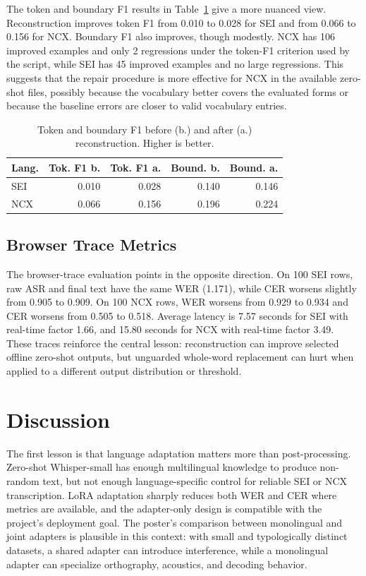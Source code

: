 \documentclass[11pt]{article}
\begin{document}
The token and boundary F1 results in Table~\ref{tab:f1} give a more nuanced view. Reconstruction improves token F1 from 0.010 to 0.028 for SEI and from 0.066 to 0.156 for NCX. Boundary F1 also improves, though modestly. NCX has 106 improved examples and only 2 regressions under the token-F1 criterion used by the script, while SEI has 45 improved examples and no large regressions. This suggests that the repair procedure is more effective for NCX in the available zero-shot files, possibly because the vocabulary better covers the evaluated forms or because the baseline errors are closer to valid vocabulary entries.

\begin{table}[t]
\centering
\small
\begin{tabular}{lrrrr}
\toprule
Lang. & Tok. F1 b. & Tok. F1 a. & Bound. b. & Bound. a.\\
\midrule
SEI & 0.010 & 0.028 & 0.140 & 0.146\\
NCX & 0.066 & 0.156 & 0.196 & 0.224\\
\bottomrule
\end{tabular}
\caption{Token and boundary F1 before (b.) and after (a.) reconstruction. Higher is better.}
\label{tab:f1}
\end{table}

\subsection{Browser Trace Metrics}

The browser-trace evaluation points in the opposite direction. On 100 SEI rows, raw ASR and final text have the same WER (1.171), while CER worsens slightly from 0.905 to 0.909. On 100 NCX rows, WER worsens from 0.929 to 0.934 and CER worsens from 0.505 to 0.518. Average latency is 7.57 seconds for SEI with real-time factor 1.66, and 15.80 seconds for NCX with real-time factor 3.49. These traces reinforce the central lesson: reconstruction can improve selected offline zero-shot outputs, but unguarded whole-word replacement can hurt when applied to a different output distribution or threshold.

\section{Discussion}

The first lesson is that language adaptation matters more than post-processing. Zero-shot Whisper-small has enough multilingual knowledge to produce non-random text, but not enough language-specific control for reliable SEI or NCX transcription. LoRA adaptation sharply reduces both WER and CER where metrics are available, and the adapter-only design is compatible with the project's deployment goal. The poster's comparison between monolingual and joint adapters is plausible in this context: with small and typologically distinct datasets, a shared adapter can introduce interference, while a monolingual adapter can specialize orthography, acoustics, and decoding behavior.
\end{document}
